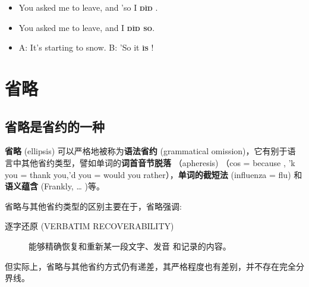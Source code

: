 \begin{itemize}
\item You asked me to leave, and 'so I  \textbf{\textsc{d\`id}} .
\item You asked me to leave, and  I \textbf{\textsc{d\`id so}}.
\item A: It's starting to snow. B: 'So it \textbf{\textsc{\`is}} !
\end{itemize}

\section{省略}

\subsection{省略是省约的一种}

\textbf{省略} (ellipsis) 可以严格地被称为\textbf{语法省约} (grammatical omission)，它有别于语
言中其他省约类型，譬如单词的\textbf{词首音节脱落} （apheresis) （cos = because , 'k
you = thank you,'d you = would you rather），\textbf{单词的截短法} (influenza = flu)
和\textbf{语义蕴含} (Frankly, \ldots{} )等。

省略与其他省约类型的区别主要在于，省略强调:
\begin{description}
\item[逐字还原 (VERBATIM RECOVERABILITY)] 能够精确恢复和重新某一段文字、发音
  和记录的内容。
\end{description}

但实际上，省略与其他省约方式仍有递差，其严格程度也有差别，并不存在完全分界线。



